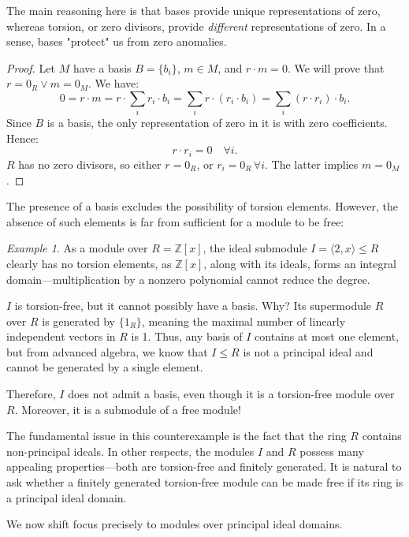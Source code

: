 \documentclass{article}
\newif\ifusemulticols
\theoremstyle{definition}
\theoremstyle{remark}
\newtheorem{example}{Example}[section]
\theoremstyle{plain}
\theoremstyle{plain}
\newenvironment{mymulticols}
    { \ifusemulticols \begin{multicols}{2} \fi }
    { \ifusemulticols \end{multicols} \fi }
\newcommand{\Z}{\mathbb{Z}}
\begin{document}
\begin{mymulticols}
The main reasoning here is that bases provide unique representations of zero, whereas torsion, or
zero divisors, provide \emph{different} representations of zero. In a sense, bases "protect" us from
zero anomalies.

\begin{proof}
    Let $M$ have a basis $B = \{b_i\}$, $m \in M$, and $r \cdot m = 0$. We will prove that $r = 0_R \lor m = 0_M$. We have:
    $$0 = r \cdot m = r \cdot \sum_i r_i \cdot b_i = \sum_i r \cdot (r_i \cdot b_i) = \sum_i (r \cdot r_i) \cdot b_i.$$
    Since $B$ is a basis, the only representation of zero in it is with zero coefficients. Hence:
    $$r \cdot r_i = 0 \quad \forall i.$$
    $R$ has no zero divisors, so either $r = 0_R$, or $r_i = 0_R \, \forall i$. The latter implies
    $m = 0_M$.
\end{proof}

The presence of a basis excludes the possibility of torsion elements. However, the absence of such
elements is far from sufficient for a module to be free:

\begin{example}
    As a module over $R = \Z[x]$, the ideal submodule $I = \langle 2, x \rangle \le R$ clearly has
    no torsion elements, as $\Z[x]$, along with its ideals, forms an integral domain—multiplication
    by a nonzero polynomial cannot reduce the degree.

    $I$ is torsion-free, but it cannot possibly have a basis. Why?
    Its supermodule $R$ over $R$ is generated by $\{1_R\}$, meaning the maximal number of linearly
    independent vectors in $R$ is 1.
    Thus, any basis of $I$ contains at most one element, but from advanced algebra, we know that $I
    \le R$ is not a principal ideal and cannot be generated by a single element.

    Therefore, $I$ does not admit a basis, even though it is a torsion-free module over $R$.
    Moreover, it is a submodule of a free module!
\end{example}

The fundamental issue in this counterexample is the fact that the ring $R$ contains non-principal ideals.
In other respects, the modules $I$ and $R$ possess many appealing properties—both are torsion-free and finitely generated.
It is natural to ask whether a finitely generated torsion-free module can be made free if its ring
is a principal ideal domain.

We now shift focus precisely to modules over principal ideal domains.


\end{mymulticols}
\end{document}
